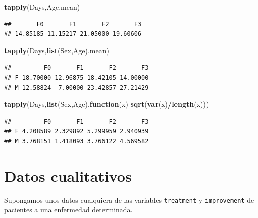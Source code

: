 \documentclass[]{book}
\newenvironment{Shaded}{\begin{snugshade}}{\end{snugshade}}
\newcommand{\KeywordTok}[1]{\textcolor[rgb]{0.13,0.29,0.53}{\textbf{#1}}}
\newcommand{\ControlFlowTok}[1]{\textcolor[rgb]{0.13,0.29,0.53}{\textbf{#1}}}
\newcommand{\OperatorTok}[1]{\textcolor[rgb]{0.81,0.36,0.00}{\textbf{#1}}}
\newcommand{\NormalTok}[1]{#1}
\begin{document}
\begin{Shaded}
\begin{Highlighting}[]
\KeywordTok{tapply}\NormalTok{(Days,Age,mean)}
\end{Highlighting}
\end{Shaded}

\begin{verbatim}
##       F0       F1       F2       F3 
## 14.85185 11.15217 21.05000 19.60606
\end{verbatim}

\begin{Shaded}
\begin{Highlighting}[]
\KeywordTok{tapply}\NormalTok{(Days,}\KeywordTok{list}\NormalTok{(Sex,Age),mean)}
\end{Highlighting}
\end{Shaded}

\begin{verbatim}
##         F0       F1       F2       F3
## F 18.70000 12.96875 18.42105 14.00000
## M 12.58824  7.00000 23.42857 27.21429
\end{verbatim}

\begin{Shaded}
\begin{Highlighting}[]
\KeywordTok{tapply}\NormalTok{(Days,}\KeywordTok{list}\NormalTok{(Sex,Age),}\ControlFlowTok{function}\NormalTok{(x) }\KeywordTok{sqrt}\NormalTok{(}\KeywordTok{var}\NormalTok{(x)}\OperatorTok{/}\KeywordTok{length}\NormalTok{(x)))}
\end{Highlighting}
\end{Shaded}

\begin{verbatim}
##         F0       F1       F2       F3
## F 4.208589 2.329892 5.299959 2.940939
## M 3.768151 1.418093 3.766122 4.569582
\end{verbatim}

\section{Datos cualitativos}\label{datos-cualitativos}

Supongamos unos datos cualquiera de las variables \texttt{treatment} y
\texttt{improvement} de pacientes a una enfermedad determinada.
\end{document}
